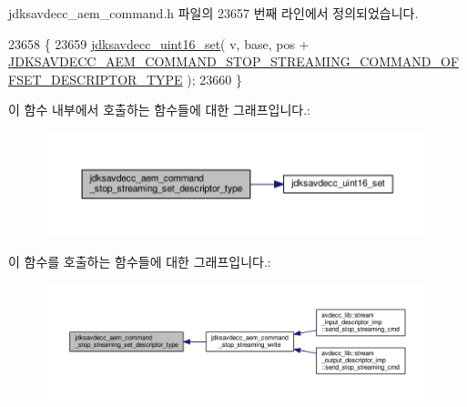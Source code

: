 jdksavdecc\+\_\+aem\+\_\+command.\+h 파일의 23657 번째 라인에서 정의되었습니다.


\begin{DoxyCode}
23658 \{
23659     \hyperlink{group__endian_ga14b9eeadc05f94334096c127c955a60b}{jdksavdecc\_uint16\_set}( v, base, pos + 
      \hyperlink{group__command__stop__streaming_ga7dcc921aa0afc55f040e3ca494967ff1}{JDKSAVDECC\_AEM\_COMMAND\_STOP\_STREAMING\_COMMAND\_OFFSET\_DESCRIPTOR\_TYPE}
       );
23660 \}
\end{DoxyCode}


이 함수 내부에서 호출하는 함수들에 대한 그래프입니다.\+:
\nopagebreak
\begin{figure}[H]
\begin{center}
\leavevmode
\includegraphics[width=350pt]{group__command__stop__streaming_ga84efe9079c247fd79b63a4b1834dfeaa_cgraph}
\end{center}
\end{figure}




이 함수를 호출하는 함수들에 대한 그래프입니다.\+:
\nopagebreak
\begin{figure}[H]
\begin{center}
\leavevmode
\includegraphics[width=350pt]{group__command__stop__streaming_ga84efe9079c247fd79b63a4b1834dfeaa_icgraph}
\end{center}
\end{figure}


